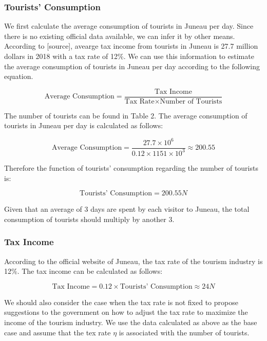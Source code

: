 \subsubsection{Tourists' Consumption}

We first calculate the average consumption of tourists in Juneau per day. Since there is no existing official data available, 
we can infer it by other means. According to [source], avearge tax income from tourists in Juneau is 27.7 million dollars in 2018
with a tax rate of 12\%. We can use this information to estimate the average consumption of tourists in Juneau per day according to 
the following equation.

\begin{equation}
    \text{Average Consumption} = \frac{\text{Tax Income}}{\text{Tax Rate} \times \text{Number of Tourists}}
\end{equation}

The number of tourists can be found in Table 2. The average consumption of 
tourists in Juneau per day is calculated as follows:

\begin{equation}
    \text{Average Consumption} = \frac{27.7 \times 10^6}{0.12 \times 1151 \times 10^3} \approx 200.55
\end{equation}

Therefore the function of tourists' consumption regarding the number of tourists is:


\begin{equation}
    \text{Tourists' Consumption} = 200.55 N
\end{equation}

Given that an average of 3 days are spent by each visitor to Juneau, 
the total consumption of tourists should multiply by another 3.

\subsubsection{Tax Income}

According to the official website of Juneau, the tax rate of the tourism industry is 12\%.
The tax income can be calculated as follows:

\begin{equation}
    \text{Tax Income} = 0.12 \times \text{Tourists' Consumption} \approx 24 N
\end{equation}

We should also consider the case when the tax rate is not fixed to propose suggestions to the
government on how to adjust the tax rate to maximize the income of the tourism industry. We
use the data calculated as above as the base case and assume that the tex rate $\eta$ is associated with the number of tourists.

